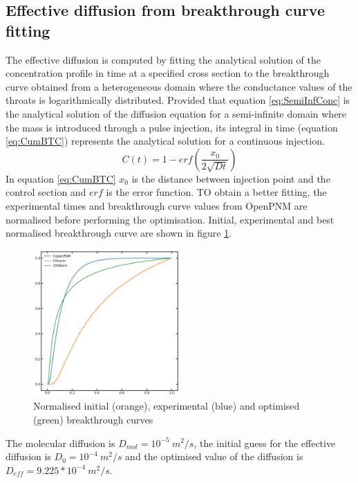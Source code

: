 \documentclass{article}
\begin{document}
\subsection{Effective diffusion from breakthrough curve fitting}
The effective diffusion is computed by fitting the analytical solution of the concentration profile in time at a specified cross section to the breakthrough curve obtained from a heterogeneous domain where the conductance values of the throats is logarithmically distributed. Provided that equation \ref{eq:SemiInfConc} is the analytical solution of the diffusion equation for a semi-infinite domain where the mass is introduced through a pulse injection, its integral in time (equation \ref{eq:CumBTC}) represents the analytical solution for a continuous injection.
\begin{equation}
    C(t) = 1 - erf \left( \frac{x_0}{2 \sqrt{D t}} \right)
    \label{eq:CumBTC}
\end{equation}
In equation \ref{eq:CumBTC} $x_0$ is the distance between injection point and the control section and $erf$ is the error function.
TO obtain a better fitting, the experimental times and breakthrough curve values from OpenPNM are normalised before performing the optimisation. Initial, experimental and best normalised breakthrough curve are shown in figure \ref{fig:NormBTC}.
\begin{figure}[htbp]
    \centering
    \includegraphics[width=0.5\textwidth]{images/fromOpenPNM/NormBTC.png}
    \caption{Normalised initial (orange), experimental (blue) and optimised (green) breakthrough curves}
    \label{fig:NormBTC}
\end{figure}
The molecular diffusion is $D_{mol}=10^{-5} \: m^2/s$, the initial guess for the effective diffusion is $D_{0}=10^{-4} \: m^2/s$ and the optimised value of the diffusion is $D_{eff}=9.225*10^{-4} \: m^2/s$.

\FloatBarrier  %
\end{document}
